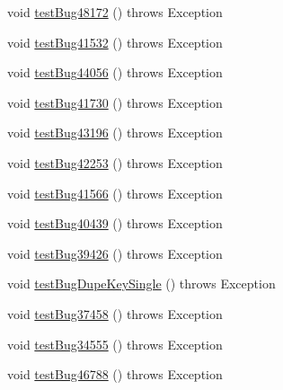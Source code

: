 \begin{DoxyCompactItemize}
\item 
void \mbox{\hyperlink{classtestsuite_1_1regression_1_1_statement_regression_test_afd2e1dfdf807ebf03427ee8e2dcd52a1}{test\+Bug48172}} ()  throws Exception 
\item 
void \mbox{\hyperlink{classtestsuite_1_1regression_1_1_statement_regression_test_a793c2353636c4363f1d946e6d1645677}{test\+Bug41532}} ()  throws Exception 
\item 
void \mbox{\hyperlink{classtestsuite_1_1regression_1_1_statement_regression_test_a51bfb33bc4a3aa413859fd7fef39f1c2}{test\+Bug44056}} ()  throws Exception 
\item 
void \mbox{\hyperlink{classtestsuite_1_1regression_1_1_statement_regression_test_a577dd5753efef8b155b1175b60bb7d08}{test\+Bug41730}} ()  throws Exception 
\item 
void \mbox{\hyperlink{classtestsuite_1_1regression_1_1_statement_regression_test_a2006a6439a57cec96a89290938a550aa}{test\+Bug43196}} ()  throws Exception 
\item 
void \mbox{\hyperlink{classtestsuite_1_1regression_1_1_statement_regression_test_a9f883c6b6762ed6ca5fb1def78ce1e9f}{test\+Bug42253}} ()  throws Exception 
\item 
void \mbox{\hyperlink{classtestsuite_1_1regression_1_1_statement_regression_test_aaf0b283354633523bf2979d409cf7c5e}{test\+Bug41566}} ()  throws Exception 
\item 
void \mbox{\hyperlink{classtestsuite_1_1regression_1_1_statement_regression_test_a5be004089f30db1981aaecf13a88965f}{test\+Bug40439}} ()  throws Exception 
\item 
void \mbox{\hyperlink{classtestsuite_1_1regression_1_1_statement_regression_test_af7a8d3ae42412501a9698312d9308f8d}{test\+Bug39426}} ()  throws Exception 
\item 
void \mbox{\hyperlink{classtestsuite_1_1regression_1_1_statement_regression_test_a227b1b491d7f14a03e35fa9f7c47cbda}{test\+Bug\+Dupe\+Key\+Single}} ()  throws Exception 
\item 
void \mbox{\hyperlink{classtestsuite_1_1regression_1_1_statement_regression_test_a58a021ee89bb1a822729f1cafec75c37}{test\+Bug37458}} ()  throws Exception 
\item 
void \mbox{\hyperlink{classtestsuite_1_1regression_1_1_statement_regression_test_ad5a8a865931de879fb95f5947f0d2c4f}{test\+Bug34555}} ()  throws Exception 
\item 
void \mbox{\hyperlink{classtestsuite_1_1regression_1_1_statement_regression_test_a6da28e12184740a1d0bc3ee485d5d52b}{test\+Bug46788}} ()  throws Exception 

\end{DoxyCompactItemize}
